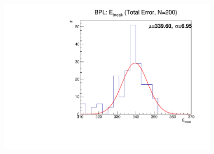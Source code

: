 \documentclass{beamer}
\begin{document}
\begin{frame}
\begin{columns}
    \begin{figure}[h!]
      \includegraphics[height=\textwidth]{figure/monte_carlo/N200/BPLwHe_e_break_tot.pdf}
    \end{figure}    
  \end{columns}
\end{frame}

\end{document}
